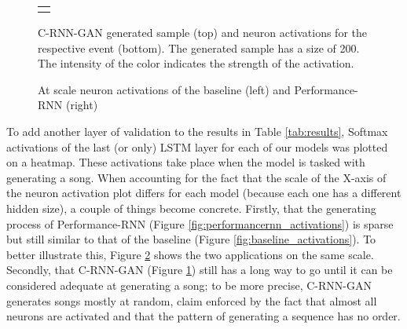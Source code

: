 \documentclass[a4paper]{book}
\begin{document}
\begin{figure}
        \begin{tabular}{c}
             \\
             \\
    \end{tabular}
    \caption{C-RNN-GAN generated sample (top) and neuron activations for the respective event (bottom). The generated sample has a size of 200. The intensity of the color indicates the strength of the activation.}
    \label{fig:crnngan_activations}
\end{figure}

\begin{figure}[t]
    \setlength\heatwidth{6.25cm}
    \begin{subfigure}[b]{0.5\linewidth}
        \setlength\heatheight{8cm}
        
    \end{subfigure}
    \begin{subfigure}[b]{0.5\linewidth}
        \setlength\heatheight{14.5cm}
        
    \end{subfigure}
    \caption{At scale neuron activations of the baseline (left) and Performance-RNN (right)}
    \label{fig:acts_scaled}
\end{figure}

To add another layer of validation to the results in Table \ref{tab:results}, Softmax activations of the last (or only) LSTM layer for each of our models was plotted on a heatmap. These activations take place when the model is tasked with generating a song. When accounting for the fact that the scale of the X-axis of the neuron activation plot differs for each model (because each one has a different hidden size), a couple of things become concrete. Firstly, that the generating process of Performance-RNN (Figure \ref{fig:performancernn_activations}) is sparse but still similar to that of the baseline (Figure \ref{fig:baseline_activations}). To better illustrate this, Figure \ref{fig:acts_scaled} shows the two applications on the same scale. Secondly, that C-RNN-GAN (Figure \ref{fig:crnngan_activations}) still has a long way to go until it can be considered adequate at generating a song; to be more precise, C-RNN-GAN generates songs mostly at random, claim enforced by the fact that almost all neurons are activated and that the pattern of generating a sequence has no order.
\end{document}
